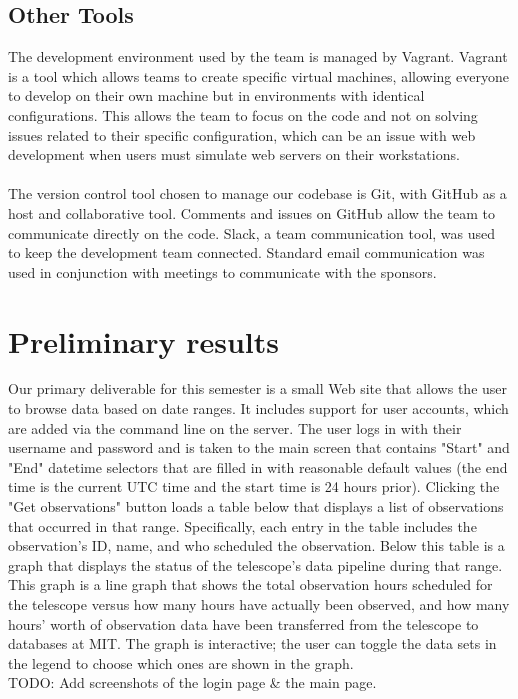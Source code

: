 \documentclass[12pt]{article}
\begin{document}
\begin{spacing}{1.5}
\subsection{Other Tools}
The development environment used by the team is managed by Vagrant. Vagrant is a tool which allows teams to create specific virtual machines, allowing everyone to develop on their own machine but in environments with identical configurations. This allows the team to focus on the code and not on solving issues related to their specific configuration, which can be an issue with web development when users must simulate web servers on their workstations.
\\ \\
The version control tool chosen to manage our codebase is Git, with GitHub as a host and collaborative tool. Comments and issues on GitHub allow the team to communicate directly on the code. Slack, a team communication tool, was used to keep the development team connected. Standard email communication was used in conjunction with meetings to communicate with the sponsors.

\section{Preliminary results}
Our primary deliverable for this semester is a small Web site that allows the user to browse data based on date ranges. It includes support for user accounts, which are added via the command line on the server. The user logs in with their username and password and is taken to the main screen that contains "Start" and "End" datetime selectors that are filled in with reasonable default values (the end time is the current UTC time and the start time is 24 hours prior). Clicking the "Get observations" button loads a table below that displays a list of observations that occurred in that range. Specifically, each entry in the table includes the observation's ID, name, and who scheduled the observation. Below this table is a graph that displays the status of the telescope's data pipeline during that range. This graph is a line graph that shows the total observation hours scheduled for the telescope versus how many hours have actually been observed, and how many hours' worth of observation data have been transferred from the telescope to databases at MIT. The graph is interactive; the user can toggle the data sets in the legend to choose which ones are shown in the graph.
\\
TODO: Add screenshots of the login page \& the main page.

\end{spacing}
\end{document}

